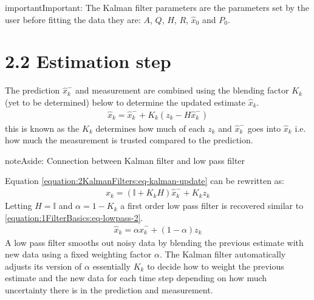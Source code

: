 \documentclass[letterpaper,10pt,english]{jupyterBook}
\begin{document}
\begin{sphinxadmonition}{important}{Important:}
\sphinxAtStartPar
The Kalman filter parameters are the parameters set by the user before fitting the data they are: \(A\), \(Q\), \(H\), \(R\), \(\hat{x}_0\) and \(P_0\).
\end{sphinxadmonition}


\section{2.2 Estimation step}
\label{\detokenize{2KalmanFilters:estimation-step}}
\sphinxAtStartPar
The prediction \(\hat{x}^-_k\) and measurement are combined using the blending factor \(K_k\) (yet to be determined) below to determine the updated estimate \(\hat{x}_k\).
\begin{equation}\label{equation:2KalmanFilters:eq-kalman-update}
\begin{split}\hat{x}_k = \hat{x}^-_k + K_k(z_k - H\hat{x}^-_k)\end{split}
\end{equation}
\sphinxAtStartPar
this is known as the  \(K_k\) determines how much of each \(z_k\) and \(\hat{x}^-_k\) goes into \(\hat{x}_k\) i.e. how much the measurement is trusted compared to the prediction.

\begin{sphinxadmonition}{note}{Aside: Connection between Kalman filter and low pass filter}

\sphinxAtStartPar
Equation \eqref{equation:2KalmanFilters:eq-kalman-update} can be rewritten as:
\begin{equation}\label{equation:2KalmanFilters:eq-kalman-lowpass}
\begin{split}\hat{x}_k = (\mathbb{I} + K_k H)\hat{x}^-_k + K_k z_k\end{split}
\end{equation}
\sphinxAtStartPar
Letting \(H = \mathbb{I}\) and \(\alpha= 1-K_k\) a first order low pass filter is recovered similar to \eqref{equation:1FilterBasics:eq-lowpass-2}.
\begin{equation}\label{equation:2KalmanFilters:eq-kalman-alpha}
\begin{split}\hat{x}_k = \alpha \hat{x}^-_{k} + (1 - \alpha) z_k\end{split}
\end{equation}
\sphinxAtStartPar
A low pass filter smooths out noisy data by blending the previous estimate with new data using a fixed weighting factor \(\alpha\). The Kalman filter automatically adjusts its version of \(\alpha\) essentially \(K_k\) to decide how to weight the previous estimate and the new data for each time step depending on how much uncertainty there is in the prediction and measurement.
\end{sphinxadmonition}
\end{document}
